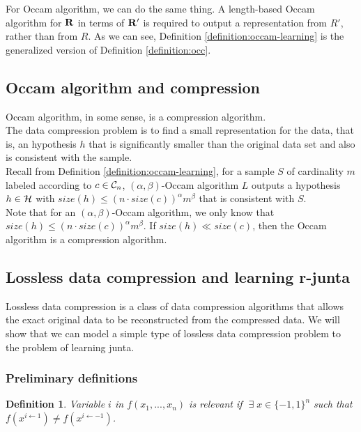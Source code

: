 \documentclass[12pt]{article}
\newtheorem{definition}[theorem]{Definition}
\newcommand{\calc}{{\cal C}}
\newcommand{\calh}{{\cal H}}
\begin{document}
For Occam algorithm, we can do the same thing. A length-based Occam algorithm for ${\bf R}$ in terms of ${\bf R'}$ is required to output a representation from $R'$, rather than from $R$. As we can see, Definition \ref {definition:occam-learning} is the generalized version of Definition \ref {definition:occ}.

\subsection{Occam algorithm and compression}

Occam algorithm, in some sense, is a compression algorithm. \\

The data compression problem is to find a small representation for the data, that is, an hypothesis $h$ that is significantly smaller than the original data set and also is consistent with the sample. \\

Recall from Definition \ref {definition:occam-learning}, for a sample $S$ of cardinality $m$ labeled according to $c \in \calc_n$, $(\alpha, \beta)$-Occam algorithm $L$ outputs a hypothesis $h \in \calh$ with $size(h) \le (n \cdot size(c))^{\alpha}m^{\beta}$ that is consistent with $S$. \\

Note that for an $(\alpha, \beta)$-Occam algorithm, we only know that $size(h) \le (n \cdot size(c))^{\alpha}m^{\beta}$. If $size(h) \ll size(c)$, then the Occam algorithm is a compression algorithm.

\subsection{Lossless data compression and learning r-junta}

Lossless data compression is a class of data compression algorithms that allows the exact original data to be reconstructed from the compressed data. We will show that we can model a simple type of lossless data compression problem to the problem of learning junta.

\subsubsection{Preliminary definitions}

\begin{definition}
Variable $i$ in $f(x_1,...,x_n)$ is \emph {relevant} if $\; \exists \; x \in \{-1, 1 \}^n$ such that $f(x^{i \leftarrow 1}) \neq f(x^{i \leftarrow -1})$.
\end{definition}
\end{document}
